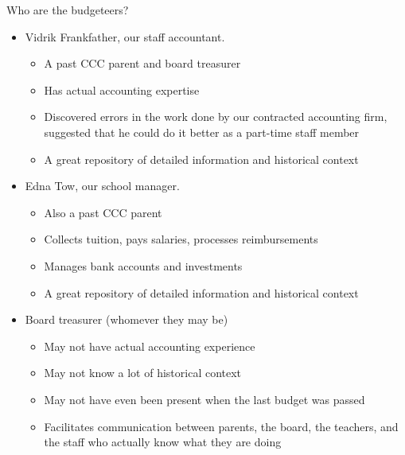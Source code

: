 \documentclass[8pt]{beamer}
\begin{document}
\begin{frame}{Who are the budgeteers?}
%
\begin{itemize}
%
\item Vidrik Frankfather, our staff accountant.
\begin{itemize}
    \item A past CCC parent and board treasurer
    \item Has actual accounting expertise
    \item Discovered errors in the work done by our contracted accounting firm,
        suggested that he could do it better as a part-time staff member
    \item A great repository of detailed information and historical context
\end{itemize}
%
%
\item Edna Tow, our school manager.
\begin{itemize}
    \item Also a past CCC parent
    \item Collects tuition, pays salaries, processes reimbursements
    \item Manages bank accounts and investments
    \item A great repository of detailed information and historical context
\end{itemize}
%
%
\item Board treasurer (whomever they may be)
\begin{itemize}
    \item May not have actual accounting experience
    \item May not know a lot of historical context
    \item May not have even been present when the last budget was passed
    \item Facilitates communication between parents, the board, the teachers,
        and the staff who actually know what they are doing
\end{itemize}
%
\end{itemize}
%
\end{frame}



\end{document}
